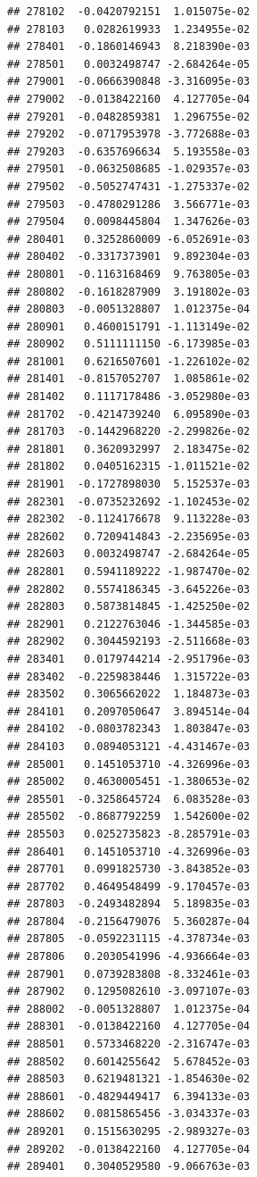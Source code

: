 \documentclass[ignorenonframetext,]{beamer}
\begin{document}
\begin{frame}[fragile]
\begin{verbatim}
## 278102  -0.0420792151  1.015075e-02
## 278103   0.0282619933  1.234955e-02
## 278401  -0.1860146943  8.218390e-03
## 278501   0.0032498747 -2.684264e-05
## 279001  -0.0666390848 -3.316095e-03
## 279002  -0.0138422160  4.127705e-04
## 279201  -0.0482859381  1.296755e-02
## 279202  -0.0717953978 -3.772688e-03
## 279203  -0.6357696634  5.193558e-03
## 279501  -0.0632508685 -1.029357e-03
## 279502  -0.5052747431 -1.275337e-02
## 279503  -0.4780291286  3.566771e-03
## 279504   0.0098445804  1.347626e-03
## 280401   0.3252860009 -6.052691e-03
## 280402  -0.3317373901  9.892304e-03
## 280801  -0.1163168469  9.763805e-03
## 280802  -0.1618287909  3.191802e-03
## 280803  -0.0051328807  1.012375e-04
## 280901   0.4600151791 -1.113149e-02
## 280902   0.5111111150 -6.173985e-03
## 281001   0.6216507601 -1.226102e-02
## 281401  -0.8157052707  1.085861e-02
## 281402   0.1117178486 -3.052980e-03
## 281702  -0.4214739240  6.095890e-03
## 281703  -0.1442968220 -2.299826e-02
## 281801   0.3620932997  2.183475e-02
## 281802   0.0405162315 -1.011521e-02
## 281901  -0.1727898030  5.152537e-03
## 282301  -0.0735232692 -1.102453e-02
## 282302  -0.1124176678  9.113228e-03
## 282602   0.7209414843 -2.235695e-03
## 282603   0.0032498747 -2.684264e-05
## 282801   0.5941189222 -1.987470e-02
## 282802   0.5574186345 -3.645226e-03
## 282803   0.5873814845 -1.425250e-02
## 282901   0.2122763046 -1.344585e-03
## 282902   0.3044592193 -2.511668e-03
## 283401   0.0179744214 -2.951796e-03
## 283402  -0.2259838446  1.315722e-03
## 283502   0.3065662022  1.184873e-03
## 284101   0.2097050647  3.894514e-04
## 284102  -0.0803782343  1.803847e-03
## 284103   0.0894053121 -4.431467e-03
## 285001   0.1451053710 -4.326996e-03
## 285002   0.4630005451 -1.380653e-02
## 285501  -0.3258645724  6.083528e-03
## 285502  -0.8687792259  1.542600e-02
## 285503   0.0252735823 -8.285791e-03
## 286401   0.1451053710 -4.326996e-03
## 287701   0.0991825730 -3.843852e-03
## 287702   0.4649548499 -9.170457e-03
## 287803  -0.2493482894  5.189835e-03
## 287804  -0.2156479076  5.360287e-04
## 287805  -0.0592231115 -4.378734e-03
## 287806   0.2030541996 -4.936664e-03
## 287901   0.0739283808 -8.332461e-03
## 287902   0.1295082610 -3.097107e-03
## 288002  -0.0051328807  1.012375e-04
## 288301  -0.0138422160  4.127705e-04
## 288501   0.5733468220 -2.316747e-03
## 288502   0.6014255642  5.678452e-03
## 288503   0.6219481321 -1.854630e-02
## 288601  -0.4829449417  6.394133e-03
## 288602   0.0815865456 -3.034337e-03
## 289201   0.1515630295 -2.989327e-03
## 289202  -0.0138422160  4.127705e-04
## 289401   0.3040529580 -9.066763e-03

\end{verbatim}
\end{frame}
\end{document}
